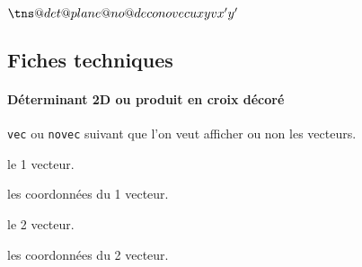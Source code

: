\documentclass[12pt,a4paper]{article}
\begin{document}
\begin{latexex}
\makeatletter
$\tns@det@plane@no@deco{novec}   %
                       {u}{x}{y} %
                       {v}{x'}{y'}$
\makeatother
\end{latexex}









\subsection{Fiches techniques}

\paragraph{Déterminant 2D ou produit en croix décoré}




 \verb+vec+ ou \verb+novec+ suivant que l'on veut afficher ou non les vecteurs. 

 le 1\ier{} vecteur.

 les coordonnées du 1\ier{} vecteur.

 le 2\ieme{} vecteur.

 les coordonnées du 2\ieme{} vecteur.
\end{document}
